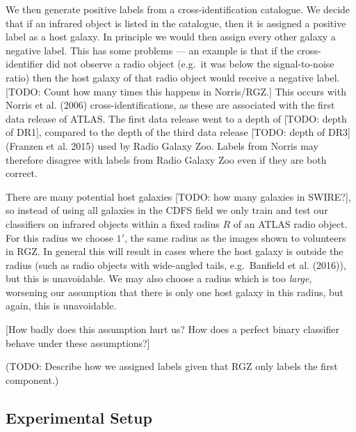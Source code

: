 \documentclass[fleqn,usenatbib,usedcolumn]{mnras}
\begin{document}
    We then generate positive labels from a cross-identification catalogue.
    We decide that if an infrared object is listed in the catalogue, then it
    is assigned a positive label as a host galaxy. In principle we would
    then assign every other galaxy a negative label. This has some problems
    --- an example is that if the cross-identifier did not observe a radio
    object (e.g.~it was below the signal-to-noise ratio) then the host
    galaxy of that radio object would receive a negative label. {[}TODO:
    Count how many times this happens in Norris/RGZ.{]} This occurs with
    Norris et al. (2006) cross-identifications, as these are associated with
    the first data release of ATLAS. The first data release went to a depth
    of {[}TODO: depth of DR1{]}, compared to the depth of the third data
    release {[}TODO: depth of DR3{]} (Franzen et al. 2015) used by Radio
    Galaxy Zoo. Labels from Norris may therefore disagree with labels from
    Radio Galaxy Zoo even if they are both correct.

    There are many potential host galaxies {[}TODO: how many galaxies in
    SWIRE?{]}, so instead of using all galaxies in the CDFS field we only
    train and test our classifiers on infrared objects within a fixed radius
    \(R\) of an ATLAS radio object. For this radius we choose \(1'\), the
    same radius as the images shown to volunteers in RGZ. In general this
    will result in cases where the host galaxy is outside the radius (such
    as radio objects with wide-angled tails, e.g.~Banfield et al. (2016)),
    but this is unavoidable. We may also choose a radius which is too
    \emph{large}, worsening our assumption that there is only one host
    galaxy in this radius, but again, this is unavoidable.

    {[}How badly does this assumption hurt us? How does a perfect binary
    classifier behave under these assumptions?{]}

    (TODO: Describe how we assigned labels given that RGZ only labels the
    first component.)

  \subsection{Experimental Setup}\label{experimental-setup}
\end{document}
